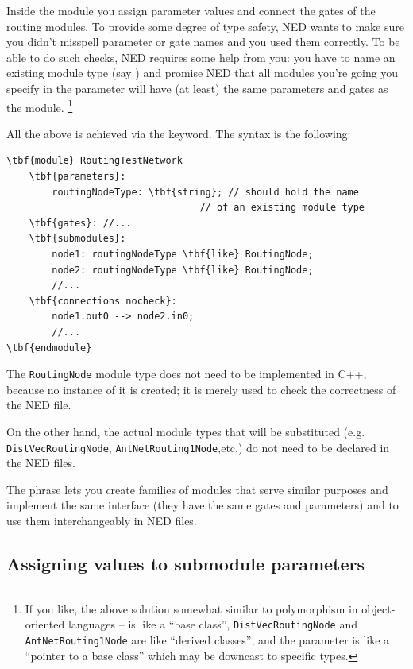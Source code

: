 Inside the  module you assign parameter values
and connect the gates of the routing modules. To provide some degree
of type safety, NED wants to make sure you didn't misspell
parameter or gate names and you used them correctly.
To be able to do such checks, NED requires some help from you:
you have to name an existing module type (say )
and promise NED that all modules you're going you specify
in the  parameter will have (at least) the same
parameters and gates as the  module.
  \footnote{If you like, the above solution somewhat similar to polymorphism
  in object-oriented languages --  is like a
  ``base class'', \texttt{DistVecRoutingNode} and \texttt{AntNetRouting1Node}
  are like ``derived classes'', and the  parameter
  is like a ``pointer to a base class'' which may be downcast to specific
  types.}

All the above is achieved via the  keyword.
The syntax is the following:

\begin{Verbatim}[commandchars=\\\{\}]
\tbf{module} RoutingTestNetwork
    \tbf{parameters}:
        routingNodeType: \tbf{string}; // should hold the name
                                  // of an existing module type
    \tbf{gates}: //...
    \tbf{submodules}:
        node1: routingNodeType \tbf{like} RoutingNode;
        node2: routingNodeType \tbf{like} RoutingNode;
        //...
    \tbf{connections nocheck}:
        node1.out0 --> node2.in0;
        //...
\tbf{endmodule}
\end{Verbatim}

The \texttt{RoutingNode} module type does not need to be implemented in
C++, because no instance of it is created; it is merely used
to check the correctness of the NED file.

On the other hand, the actual module types that will be substituted
(e.g. \texttt{DistVecRoutingNode}, \texttt{AntNetRouting1Node},etc.)
do not need to be declared in the NED files.

The  phrase lets you create families
of modules that serve similar purposes and implement the same interface
(they have the same gates and parameters)
and to use them interchangeably in NED files.




\subsection{Assigning values to submodule parameters}

